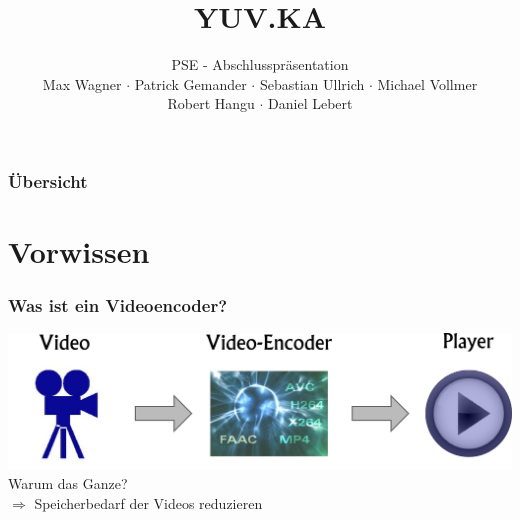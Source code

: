 \documentclass[t]{beamer}
\title{YUV.KA}
\subtitle{PSE - Abschlusspräsentation \\[0.3cm]
Max Wagner $\cdot$ Patrick Gemander $\cdot$ Sebastian Ullrich $\cdot$ Michael Vollmer \\ Robert Hangu $\cdot$ Daniel Lebert}
\institute[ITEC]{Institut für Technische Informatik}
\begin{document}
\begin{frame}
	\maketitle
\end{frame}

\begin{frame}
	\frametitle{Übersicht}
	\tableofcontents
\end{frame}

\section{Vorwissen}
\begin{frame}
	\frametitle{Was ist ein Videoencoder?}
	\begin{center}
		\vspace*{\fill}
		\includegraphics[scale=.43]{video-encoding-process.png}
		\vspace*{\fill}
		\onslide<2-> Warum das Ganze? ~\\
		\onslide<3-> $ \Longrightarrow $ Speicherbedarf der Videos reduzieren
	\end{center}
\end{frame}
\end{document}
